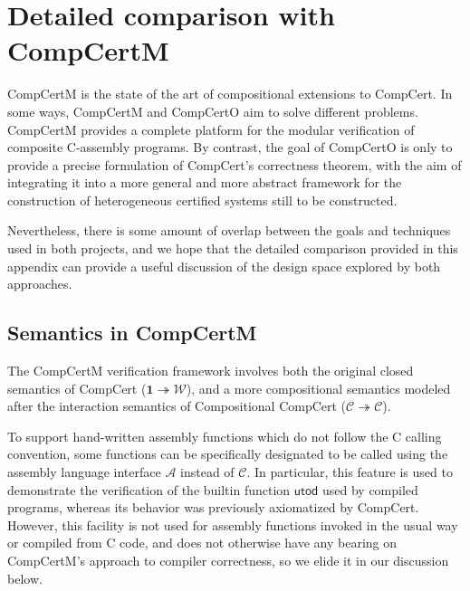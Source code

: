 \documentclass[sigplan,screen]{acmart}
\newcommand{\kw}[1]{\ensuremath{ \mathsf{#1} }}
\newcommand{\opt}[2]{#1}
\newenvironment{optional}{}{}
\newcommand{\opt}[2]{#2}
\begin{document}
\opt{}{\balance}



\begin{optional}

\appendix

\section{Detailed comparison with CompCertM} %

CompCertM is the state of the art
of compositional extensions to CompCert.
In some ways,
CompCertM and CompCertO aim to solve different problems.
CompCertM provides a complete platform
for the modular verification of composite C-assembly programs.
By contrast,
the goal of CompCertO is only to
provide a precise formulation of CompCert's correctness theorem,
with the aim of integrating it into
a more general and more abstract framework
for the construction of heterogeneous certified systems
still to be constructed.

Nevertheless,
there is some amount of overlap between
the goals and techniques used in both projects,
and we hope that the detailed comparison
provided in this appendix
can provide a useful discussion
of the design space explored by both approaches.

\subsection{Semantics in CompCertM} %

The CompCertM verification framework involves
both the original closed semantics of CompCert
($\mathbf{1} \twoheadrightarrow \mathcal{W}$),
and a more compositional semantics
modeled after the interaction semantics of Compositional CompCert
($\mathcal{C} \twoheadrightarrow \mathcal{C}$).

To support hand-written assembly functions
which do not follow the C calling convention,
some functions can be specifically designated
to be called
using the assembly language interface $\mathcal{A}$
instead of $\mathcal{C}$.
In particular,
this feature is used to demonstrate
the verification of the builtin function $\kw{utod}$
used by compiled programs,
whereas its behavior was previously
axiomatized by CompCert.
However,
this facility is not used for assembly functions
invoked in the usual way or compiled from C code,
and does not otherwise have any bearing on
CompCertM's approach to compiler correctness,
so we elide it in our discussion below.


\end{optional}
\end{document}
